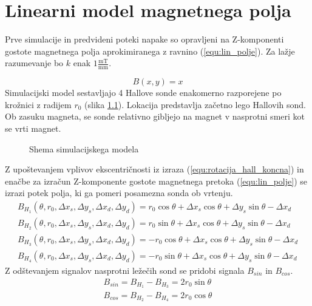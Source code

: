 \chapter{Linearni model magnetnega polja}
\label{linearnimodel}
Prve simulacije in predvideni poteki napake so opravljeni na Z-komponenti gostote magnetnega polja aprokimiranega z ravnino (\ref{equ:lin_polje}). Za lažje razumevanje bo $k$ enak $1\frac{\mathrm{mT}}{\mathrm{mm}}$.

\begin{equation}
\label{equ:lin_polje}
B(x,y)= x
\end{equation}
Simulacijski model sestavljajo 4 Hallove sonde enakomerno razporejene po krožnici z radijem $r_0$ (slika \ref{lin_simul}). Lokacija predstavlja začetno lego Hallovih sond. 
Ob zasuku magneta, se sonde relativno gibljejo na magnet v nasprotni smeri kot se vrti magnet. 
\begin{figure}[!ht]
	\centering
	\caption{Shema simulacijskega modela}
	\label{lin_simul}
\end{figure}

Z upoštevanjem vplivov ekscentričnosti iz izraza (\ref{equ:rotacija_hall_koncna}) in enačbe za izračun Z-komponente gostote magnetnega pretoka (\ref{equ:lin_polje}) se izrazi potek polja, ki ga pomeri posamezna sonda ob vrtenju.
\begin{eqnarray}
\label{equ:lin_potek_sin}
B_{H_1}(\theta, r_0, \Delta x_s, \Delta y_s, \Delta x_d, \Delta y_d)=  r_0 \cos \theta + \Delta x_s \cos \theta+ \Delta y_s \sin \theta -\Delta x_d\\
\label{equ:lin_potek_cos}
B_{H_2}(\theta, r_0, \Delta x_s, \Delta y_s, \Delta x_d, \Delta y_d)= r_0 \sin \theta + \Delta x_s \cos \theta+ \Delta y_s \sin \theta -\Delta x_d\\
B_{H_3}(\theta, r_0, \Delta x_s, \Delta y_s, \Delta x_d, \Delta y_d)=  -r_0 \cos \theta + \Delta x_s \cos \theta+ \Delta y_s \sin \theta -\Delta x_d\\
\label{equ:lin_potek_zadnja}
B_{H_4}(\theta, r_0, \Delta x_s, \Delta y_s, \Delta x_d, \Delta y_d)=-r_0 \sin \theta + \Delta x_s \cos \theta+ \Delta y_s \sin \theta -\Delta x_d
\end{eqnarray}
Z odštevanjem signalov nasprotni ležečih sond se pridobi signala  $B_{sin}$ in $B_{cos}$.
\begin{eqnarray}
B_{sin}=  B_{H_1} - B_{H_3} = 2 r_0 \sin \theta \\
B_{cos}=  B_{H_2} - B_{H_4}=  2 r_0 \cos \theta
\end{eqnarray}

